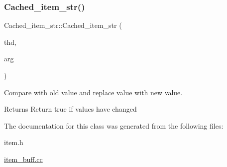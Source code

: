 \subsubsection{\texorpdfstring{Cached\+\_\+item\+\_\+str()}{Cached\_item\_str()}}
{\footnotesize\ttfamily Cached\+\_\+item\+\_\+str\+::\+Cached\+\_\+item\+\_\+str (\begin{DoxyParamCaption}\item[{T\+HD $\ast$}]{thd,  }\item[{\mbox{\hyperlink{classItem}{Item}} $\ast$}]{arg }\end{DoxyParamCaption})}

Compare with old value and replace value with new value.

\begin{DoxyReturn}{Returns}
Return true if values have changed 
\end{DoxyReturn}


The documentation for this class was generated from the following files\+:\begin{DoxyCompactItemize}
\item 
item.\+h\item 
\mbox{\hyperlink{item__buff_8cc}{item\+\_\+buff.\+cc}}\end{DoxyCompactItemize}
